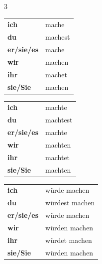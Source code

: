 \documentclass[a4paper,10pt]{article}
\begin{document}
\begin{multicols}{3}
        \begin{tcolorbox}[tensebox,title=Konjunktiv I]
            \begin{tabular}{>{\bfseries}l l}
                ich       & mache   \\
                du        & machest \\
                er/sie/es & mache   \\
                wir       & machen  \\
                ihr       & machet  \\
                sie/Sie   & machen  \\
            \end{tabular}
        \end{tcolorbox}
        
        \begin{tcolorbox}[tensebox,title=Konjunktiv II]
            \begin{tabular}{>{\bfseries}l l}
                ich       & machte   \\
                du        & machtest \\
                er/sie/es & machte   \\
                wir       & machten  \\
                ihr       & machtet  \\
                sie/Sie   & machten  \\
            \end{tabular}
        \end{tcolorbox}
        
        \begin{tcolorbox}[tensebox,title=Konjunktiv II (würde)]
            \begin{tabular}{>{\bfseries}l l}
                ich       & würde machen   \\
                du        & würdest machen \\
                er/sie/es & würde machen   \\
                wir       & würden machen  \\
                ihr       & würdet machen  \\
                sie/Sie   & würden machen  \\
            \end{tabular}
        \end{tcolorbox}
        

\end{multicols}
\end{document}
